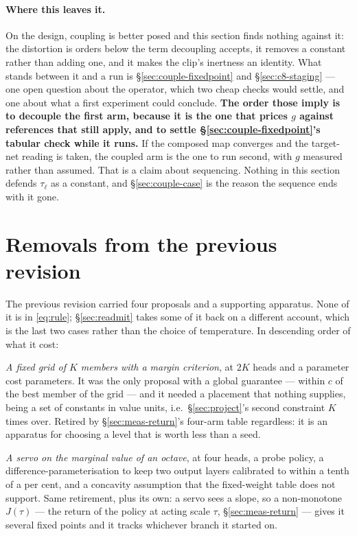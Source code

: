 \documentclass{article}
\begin{document}
\paragraph{Where this leaves it.} On the design, coupling is better posed and this section finds
nothing against it: the distortion is orders below the term decoupling accepts, it
removes a constant rather than adding one, and it makes the clip's inertness an identity. What
stands between it and a run is \S\ref{sec:couple-fixedpoint} and \S\ref{sec:c8-staging} --- one
open question about the operator, which two cheap checks would settle, and one about what a first
experiment could conclude. \textbf{The order those imply is to decouple the first arm, because it
is the one that prices $g$ against references that still apply, and to settle
\S\ref{sec:couple-fixedpoint}'s tabular check while it runs.} If the composed map converges and
the target-net reading is taken, the coupled arm is the one to run second, with $g$ measured
rather than assumed. That is a claim about sequencing. Nothing in this section defends
$\tau_\ell$ as a constant, and \S\ref{sec:couple-case} is the reason the sequence ends with it
gone.

\section{Removals from the previous revision}
\label{sec:dropped}

The previous revision carried four proposals and a supporting apparatus. None of it is in
\eqref{eq:rule}; \S\ref{sec:readmit} takes some of it back on a different account, which is the
last two cases rather than the choice of temperature. In descending order of what it cost:

\emph{A fixed grid of $K$ members with a margin criterion}, at $2K$ heads and a parameter cost
parameters. It was the only proposal with a global guarantee --- within $c$ of the best member of
the grid --- and it needed a placement that nothing supplies, being a set of constants in value
units, i.e.\ \S\ref{sec:project}'s second constraint $K$ times over. Retired by \S\ref{sec:meas-return}'s four-arm table
regardless: it is an apparatus for choosing a level that is worth less than a seed.

\emph{A servo on the marginal value of an octave}, at four heads, a probe policy, a
difference-parameterisation to keep two output layers calibrated to within a tenth of a per cent,
and a concavity assumption that the fixed-weight table does not support. Same retirement, plus its
own: a servo sees a slope, so a non-monotone $J(\tau)$ --- the return of the policy at acting
scale $\tau$, \S\ref{sec:meas-return} --- gives it several fixed points and it tracks whichever
branch it started on.
\end{document}
